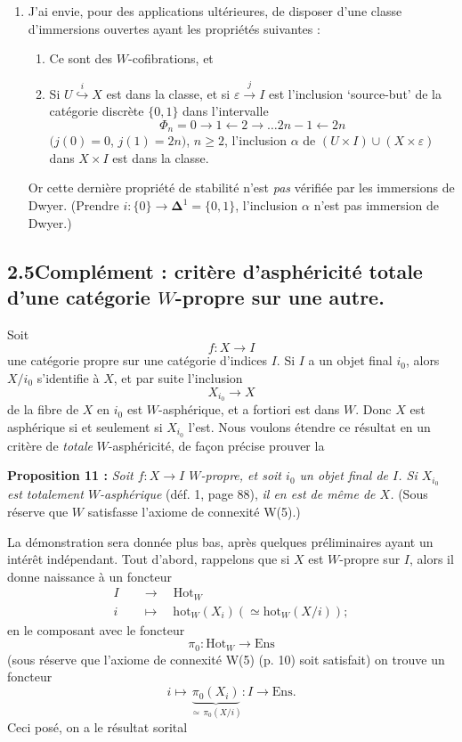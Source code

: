 \documentclass[11pt]{article}
\newcommand{\printedpage}[1]{\marginpar{\footnotesize p.~#1}}
\newcommand{\msp}[1]{\marginpar{\footnotesize [#1]}}
\begin{document}
\printedpage{78}
\begin{enumerate}
\item[b)] J'ai envie, pour des applications ultérieures, de disposer d'une classe d'immersions ouvertes ayant les propriétés suivantes :
\begin{enumerate}
\item[1°)] Ce sont des $W$-cofibrations, et
\item[2°)] Si $U \overset{i}{\hookrightarrow} X$ est dans la classe, et si $\varepsilon \xrightarrow{j} I$ est l'inclusion ‘source-but’ de la catégorie discrète $\{0,1\}$ dans l'intervalle
\[
\Phi_n = 0 \longrightarrow 1 \longleftarrow 2 \longrightarrow \dots 2n-1 \longleftarrow 2n
\]
$(j(0)=0$, $j(1)=2n)$, $n\geq 2$, l'inclusion $\alpha$ de $(U\times I)\cup(X\times\varepsilon)$ dans $X\times I$ est dans la classe.
\end{enumerate}
Or cette dernière propriété de stabilité n'est \textit{pas} vérifiée par les immersions de Dwyer. (Prendre $i : \{0\} \longrightarrow \boldsymbol{\Delta}^1 = \{0,1\}$, l'inclusion $\alpha$ n'est pas immersion de Dwyer.)
\end{enumerate}

\msp{page 115}

\subsection*{2.5\quad Complément : critère d'asphéricité totale d'une catégorie $W$-propre sur une autre.}

Soit
\[
f : X \longrightarrow I
\]
une catégorie propre sur une catégorie d'indices $I$. Si $I$ a un objet final $i_0$, alors $X/i_0$ s'identifie à $X$, et par suite l'inclusion
\[
X_{i_0} \longrightarrow X
\]
de la fibre de $X$ en $i_0$ est $W$-asphérique, et a fortiori est dans $W$. Donc $X$ est asphérique si et seulement si $X_{i_0}$ l'est. Nous voulons étendre ce résultat en un critère de \textit{totale} $W$-asphéricité, de façon précise prouver la

\textbf{Proposition 11 :} \textit{Soit $f : X \longrightarrow I$ $W$-propre, et soit $i_0$ un objet final de $I$. Si $X_{i_0}$ est totalement $W$-asphérique} (déf. 1, page 88), \textit{il en est de même de $X$.} (Sous réserve que $W$ satisfasse l'axiome de connexité W(5).)

La démonstration sera donnée plus bas, après quelques préliminaires ayant un intérêt indépendant. Tout d'abord, rappelons que si $X$ est $W$-propre sur $I$, alors il donne naissance à un foncteur
\[
\begin{aligned}
I \quad &\longrightarrow \quad \mathrm{Hot}_W\\
i \quad &\longmapsto \quad \mathrm{hot}_W(X_i)(\simeq \mathrm{hot}_W(X/i));
\end{aligned}
\]
en le composant avec le foncteur
\[
\pi_0 : \mathrm{Hot}_W \longrightarrow \mathrm{Ens}
\]
(sous réserve que l'axiome de connexité W(5) (p. 10) soit satisfait)
\printedpage{79}
\msp{page 116}
on trouve un foncteur
\[
i \longmapsto \underbrace{\pi_0(X_i)}_{\simeq\, \pi_0(X/i)} : I \longrightarrow \mathrm{Ens}.
\]
Ceci posé, on a le résultat sorital
\end{document}

